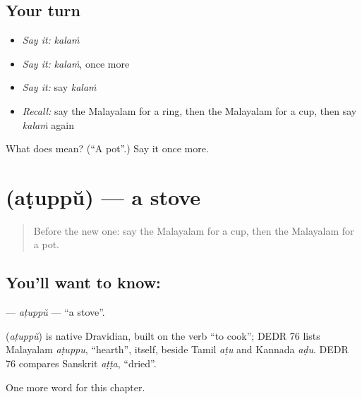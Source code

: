 \subsection*{Your turn}
\begin{itemize}
\raggedright
  \item \emph{Say it:} \emph{kalaṁ}
  \item \emph{Say it:} \emph{kalaṁ}, once more
  \item \emph{Say it:} say \emph{kalaṁ}
  \item \emph{Recall:} say the Malayalam for a ring, then the Malayalam for a cup, then say \emph{kalaṁ} again
\end{itemize}

\begin{tcolorbox}[breakable,colback=teal!4,colframe=teal!35!black,title={Before you move on}]
What does  mean? (\textquotedblleft{}A pot\textquotedblright{}.) Say it once more.
\end{tcolorbox}
\section[\texorpdfstring{\ml{അടുപ്പ്} (aṭuppŭ)}{അടുപ്പ് (aṭuppŭ)}]{ (aṭuppŭ) — a stove}

\label{lesson:ML-C157-atuppu}



\begin{quote}
Before the new one: say the Malayalam for a cup, then the Malayalam for a pot.
\end{quote}

\subsection*{You'll want to know: }
\textbf{} — \emph{aṭuppŭ} — \textquotedblleft{}a stove\textquotedblright{}.

\begin{cousinweb}
\textbf{} (\emph{aṭuppŭ}) is native Dravidian, built on the verb \textquotedblleft{}to cook\textquotedblright{}; DEDR 76 lists Malayalam \emph{aṭuppu}, \textquotedblleft{}hearth\textquotedblright{}, itself, beside Tamil \emph{aṭu} and Kannada \emph{aḍu}. DEDR 76 compares Sanskrit \emph{aṭṭa}, \textquotedblleft{}dried\textquotedblright{}.
\end{cousinweb}

\begin{grammarlens}[title={What you've built}]
One more word for this chapter.
\end{grammarlens}

